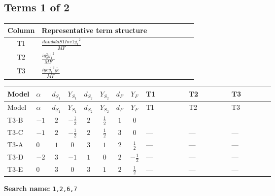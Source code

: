 \documentclass[8pt]{article}
\begin{document}
\begin{landscape}
\subsection*{Terms 1 of 2}
\begin{center}
\begin{tabular}{@{}c >{\raggedright\arraybackslash}p{0.82\linewidth}@{}}
\toprule
Column & Representative term structure \\
\midrule
T1 & \(\displaystyle \frac{i lambdaS1Inv1 \overline{y_{1}}^{2}}{MF}\) \\
\midrule
T2 & \(\displaystyle \frac{i g_{2}^{2} \overline{y_{1}}^{2}}{MF}\) \\
\midrule
T3 & \(\displaystyle \frac{i ye \overline{y_{1}}^{2} \overline{ye}}{MF}\) \\
\midrule
\bottomrule
\end{tabular}
\end{center}
\smallskip
\tiny
\begin{longtable}{@{}llcccccc >{\raggedright\arraybackslash}p{0.21\linewidth} >{\raggedright\arraybackslash}p{0.21\linewidth} >{\raggedright\arraybackslash}p{0.21\linewidth}@{}}
\toprule
Model & $\alpha$ & $d_{S_1}$ & $Y_{S_1}$ & $d_{S_2}$ & $Y_{S_2}$ & $d_F$ & $Y_F$ & T1 & T2 & T3 \\
\midrule
\endfirsthead
\toprule
Model & $\alpha$ & $d_{S_1}$ & $Y_{S_1}$ & $d_{S_2}$ & $Y_{S_2}$ & $d_F$ & $Y_F$ & T1 & T2 & T3 \\
\midrule
\endhead
T3-B & $-1$ & $2$ & $-\frac{1}{2}$ & $2$ & $\frac{1}{2}$ & $1$ & $0$ & \scriptsize\adjustbox{max width=\linewidth}{$\begin{gathered} \frac{i lambdaS1Inv1 \overline{y_{1}}^{2}}{4 MF}\end{gathered}$} & \scriptsize\adjustbox{max width=\linewidth}{$\begin{gathered} \frac{3 i g_{2}^{2} \overline{y_{1}}^{2}}{8 MF}\end{gathered}$} & \scriptsize\adjustbox{max width=\linewidth}{$\begin{gathered} - \frac{i ye \overline{y_{1}}^{2} \overline{ye}}{8 MF}\end{gathered}$} \\
\midrule
T3-C & $-1$ & $2$ & $-\frac{1}{2}$ & $2$ & $\frac{1}{2}$ & $3$ & $0$ & --- & --- & --- \\
\midrule
T3-A & $0$ & $1$ & $0$ & $3$ & $1$ & $2$ & $\frac{1}{2}$ & --- & --- & --- \\
\midrule
T3-D & $-2$ & $3$ & $-1$ & $1$ & $0$ & $2$ & $-\frac{1}{2}$ & --- & --- & --- \\
\midrule
T3-E & $0$ & $3$ & $0$ & $3$ & $1$ & $2$ & $\frac{1}{2}$ & --- & --- & --- \\
\midrule
\bottomrule
\end{longtable}
\clearpage
\noindent\textbf{Search name: }\texttt{1,2,6,7}\par\smallskip

\end{landscape}
\end{document}
